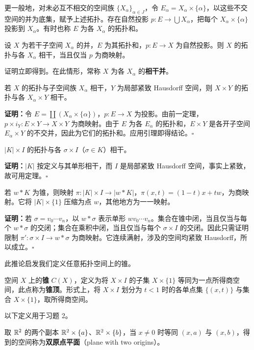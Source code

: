 更一般地，对未必互不相交的空间族 $\{X_\alpha\}_{\alpha\in J}$，令 $E_\alpha=X_\alpha\times\{\alpha\}$，以这些不交空间的并为底集，赋予上述拓扑。存在自然投影 $p:E\to\bigcup X_\alpha$，把每个 $X_\alpha\times\{\alpha\}$ 投影到 $X_\alpha$。有时也称 $E$ 为各 $X_\alpha$ 的拓扑和。

设 $X$ 为若干子空间 $X_\alpha$ 的并，$E$ 为其拓扑和，$p:E\to X$ 为自然投影。则 $X$ 的拓扑与各 $X_\alpha$ 相干，当且仅当 $p$ 为商映射。

证明立即得到。在此情形，常称 $X$ 为各 $X_\alpha$ 的\textbf{相干并}。

若 $X$ 的拓扑与子空间族 $X_\alpha$ 相干，$Y$ 为局部紧致 Hausdorff 空间，则 $X\times Y$ 的拓扑与各 $X_\alpha\times Y$ 相干。

\noindent\textbf{证明：}令 $E=\coprod(X_\alpha\times\{\alpha\})$，$p:E\to X$ 为投影。由前一定理，$p\times i_Y:E\times Y\to X\times Y$ 为商映射。由于 $E$ 为各 $E_\alpha$ 的拓扑和，$E\times Y$ 是各开子空间 $E_\alpha\times Y$ 的不交并，因此为它们的拓扑和。应用引理即得结论。\hfill$\square$

$|K|\times I$ 的拓扑与各 $\sigma\times I$（$\sigma\in K$）相干。

\noindent\textbf{证明：}$|K|$ 按定义与其单形相干，而 $I$ 是局部紧致 Hausdorff 空间，事实上紧致，故可用定理。\hfill$\square$

若 $w*K$ 为锥，则映射 $\pi:|K|\times I\to|w*K|$，$\pi(x,t)=(1-t)x+tw$，为商映射。它将 $|K|\times\{1\}$ 压缩为点 $w$，其他地方为一一映射。

\noindent\textbf{证明：}若 $\sigma=v_0\cdots v_n$，以 $w*\sigma$ 表示单形 $wv_0\cdots v_n$。集合在锥中闭，当且仅当与每个 $w*\sigma$ 的交闭；集合在乘积中闭，当且仅当与每个 $\sigma\times I$ 的交闭。因此只需证明限制 $\pi':\sigma\times I\to w*\sigma$ 为商映射。它连续满射，涉及的空间均紧致 Hausdorff，所以成立。\hfill$\square$

此推论启发我们定义任意拓扑空间上的锥。

空间 $X$ 上的\textbf{锥} $C(X)$，定义为将 $X\times I$ 的子集 $X\times\{1\}$ 等同为一点所得商空间，此点称为\textbf{锥顶}。形式上，将 $X\times I$ 划分为 $t<1$ 时的各单点集 $\{(x,t)\}$ 与集合 $X\times\{1\}$，取所得商空间。

以下定义用于习题 2。

取 $\mathbb{R}^2$ 的两个副本 $\mathbb{R}^2\times\{a\}$、$\mathbb{R}^2\times\{b\}$，当 $x\ne0$ 时等同 $(x,a)$ 与 $(x,b)$，得到的空间称为\textbf{双原点平面}（plane with two origins）。


